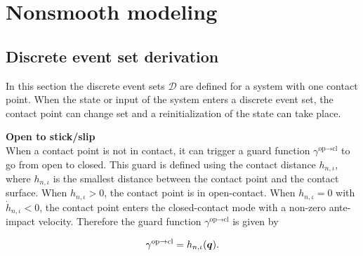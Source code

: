\documentclass[../DC2017114Bouma.tex]{subfiles}
\begin{document}

\cleartooddpage
\pagestyle{appendix}
\chapter{Nonsmooth modeling}\label{app:nonsmooth}
\section{Discrete event set derivation}\label{app:hybriddisc}
In this section the discrete event sets $\mathcal{D}$ are defined for a system with one contact point. When the state or input of the system enters a discrete event set, the contact point can change set and a reinitialization of the state can take place.

\textbf{Open to stick/slip}\\
When a contact point is not in contact, it can trigger a guard function $\gamma^{\text{op}\rightarrow\text{cl}}$ to go from open to closed. This guard is defined using the contact distance $h_{n,\iota}$, where $h_{n,\iota}$ is the smallest distance between the contact point and the contact surface. When $h_{n,\iota}>0$, the contact point is in open-contact. When $h_{n,\iota}=0$ with $\dot{h}_{n,\iota}<0$, the contact point enters the closed-contact mode with a non-zero ante-impact velocity. Therefore the guard function $\gamma^{\text{op}\rightarrow\text{cl}}$ is given by

\begin{align}
\gamma^{\text{op}\rightarrow\text{cl}} = h_{n,\iota}({\boldsymbol{q}}).
\end{align}
\end{document}
